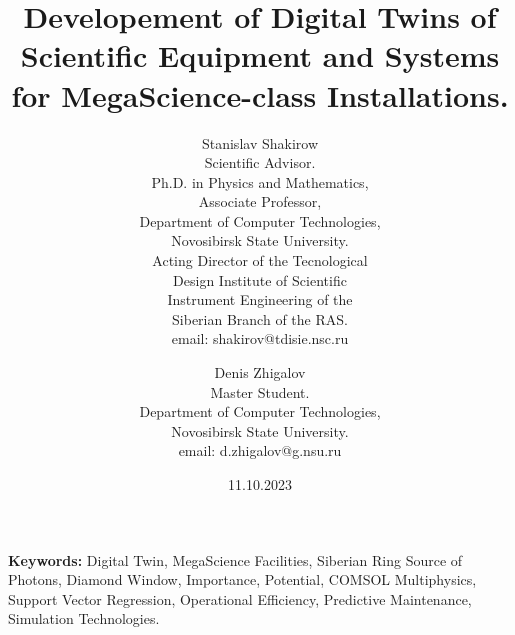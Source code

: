 \documentclass[12pt]{article}
\begin{document}
\title{Developement of Digital Twins of Scientific Equipment and Systems for MegaScience-class Installations.}
\author{
  Stanislav Shakirow \\ 
  \small{Scientific Advisor.} \\
  \small{Ph.D. in Physics and Mathematics,} \\
  \small{Associate Professor,} \\
  \small{Department of Computer Technologies,} \\ 
  \small{Novosibirsk State University.} \\
  \small {Acting Director of the Tecnological} \\ 
  \small {Design Institute of Scientific} \\
  \small{Instrument Engineering of the} \\
  \small{Siberian Branch of the RAS.} \\
  \small{email: shakirov@tdisie.nsc.ru}
  \and 
  Denis Zhigalov\\ 
  \small{Master Student.} \\ 
  \small{Department of Computer Technologies,} \\ 
  \small{Novosibirsk State University.} \\
  \small{email: d.zhigalov@g.nsu.ru}
}
\date{11.10.2023}
\maketitle


\begin{abstract}
  
\end{abstract}

\textbf{Keywords:} Digital Twin, MegaScience Facilities, Siberian Ring Source
of Photons, Diamond Window, Importance, Potential, COMSOL Multiphysics, Support
Vector Regression, Operational Efficiency, Predictive
Maintenance, Simulation Technologies.















\end{document}

